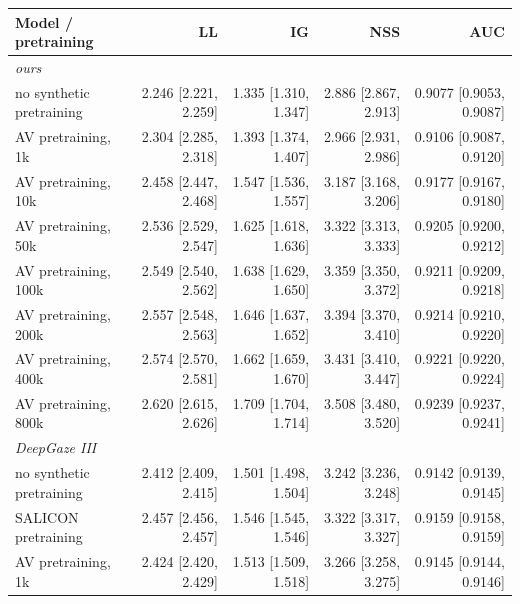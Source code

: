 \begin{table}[t]
  \centering
  \small
  \begin{tabular}{lrrrr}
    \toprule
    Model / pretraining & LL & IG & NSS & AUC \\
    \midrule
    \multicolumn{5}{l}{\emph{ours}} \\
    no synthetic pretraining & 2.246 \scriptsize[2.221, 2.259] & 1.335 \scriptsize[1.310, 1.347] & 2.886 \scriptsize[2.867, 2.913] & 0.9077 \scriptsize[0.9053, 0.9087] \\
    AV pretraining, 1k & 2.304 \scriptsize[2.285, 2.318] & 1.393 \scriptsize[1.374, 1.407] & 2.966 \scriptsize[2.931, 2.986] & 0.9106 \scriptsize[0.9087, 0.9120] \\
    AV pretraining, 10k & 2.458 \scriptsize[2.447, 2.468] & 1.547 \scriptsize[1.536, 1.557] & 3.187 \scriptsize[3.168, 3.206] & 0.9177 \scriptsize[0.9167, 0.9180] \\
    AV pretraining, 50k & 2.536 \scriptsize[2.529, 2.547] & 1.625 \scriptsize[1.618, 1.636] & 3.322 \scriptsize[3.313, 3.333] & 0.9205 \scriptsize[0.9200, 0.9212] \\
    AV pretraining, 100k & 2.549 \scriptsize[2.540, 2.562] & 1.638 \scriptsize[1.629, 1.650] & 3.359 \scriptsize[3.350, 3.372] & 0.9211 \scriptsize[0.9209, 0.9218] \\
    AV pretraining, 200k & 2.557 \scriptsize[2.548, 2.563] & 1.646 \scriptsize[1.637, 1.652] & 3.394 \scriptsize[3.370, 3.410] & 0.9214 \scriptsize[0.9210, 0.9220] \\
    AV pretraining, 400k & 2.574 \scriptsize[2.570, 2.581] & 1.662 \scriptsize[1.659, 1.670] & 3.431 \scriptsize[3.410, 3.447] & 0.9221 \scriptsize[0.9220, 0.9224] \\
    AV pretraining, 800k & 2.620 \scriptsize[2.615, 2.626] & 1.709 \scriptsize[1.704, 1.714] & 3.508 \scriptsize[3.480, 3.520] & 0.9239 \scriptsize[0.9237, 0.9241] \\
    \midrule
    \multicolumn{5}{l}{\emph{DeepGaze III}} \\
    no synthetic pretraining & 2.412 \scriptsize[2.409, 2.415] & 1.501 \scriptsize[1.498, 1.504] & 3.242 \scriptsize[3.236, 3.248] & 0.9142 \scriptsize[0.9139, 0.9145] \\
    SALICON pretraining & 2.457 \scriptsize[2.456, 2.457] & 1.546 \scriptsize[1.545, 1.546] & 3.322 \scriptsize[3.317, 3.327] & 0.9159 \scriptsize[0.9158, 0.9159] \\
    AV pretraining, 1k & 2.424 \scriptsize[2.420, 2.429] & 1.513 \scriptsize[1.509, 1.518] & 3.266 \scriptsize[3.258, 3.275] & 0.9145 \scriptsize[0.9144, 0.9146] \\

\end{tabular}
\end{table}
